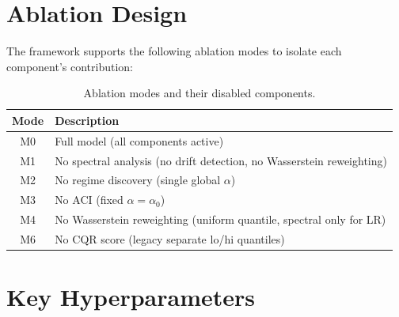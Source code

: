 \section{Ablation Design}\label{sec:ablation-design}

The framework supports the following ablation modes to isolate each
component's contribution:

\begin{table}[h]
\centering
\caption{Ablation modes and their disabled components.}
\label{tab:ablation}
\begin{tabular}{cl}
\toprule
\textbf{Mode} & \textbf{Description} \\
\midrule
M0 & Full model (all components active) \\
M1 & No spectral analysis (no drift detection, no Wasserstein reweighting) \\
M2 & No regime discovery (single global $\alpha$) \\
M3 & No ACI (fixed $\alpha = \alpha_0$) \\
M4 & No Wasserstein reweighting (uniform quantile, spectral only for LR) \\
M6 & No CQR score (legacy separate lo/hi quantiles) \\
\bottomrule
\end{tabular}
\end{table}

\section{Key Hyperparameters}\label{sec:hyperparams}

